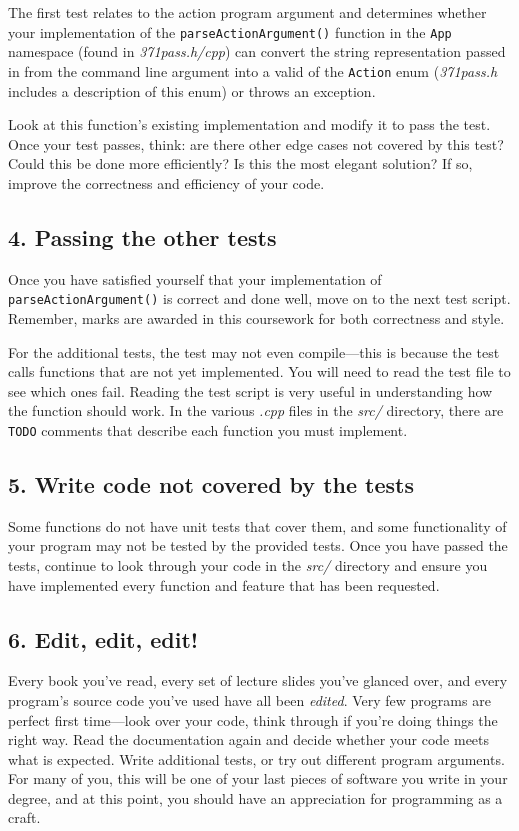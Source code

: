 \documentclass[a4paper]{article}
\begin{document}
The first test relates to the action program argument and determines whether your implementation of the \texttt{parseActionArgument()} function in the \texttt{App} namespace (found in \emph{371pass.h/cpp}) can convert the string representation passed in from the command line argument into a valid of the \texttt{Action} enum (\emph{371pass.h} includes a description of this enum) or throws an exception.

Look at this function's existing implementation and modify it to pass the test. Once your test passes, think: are there other edge cases not covered by this test? Could this be done more efficiently? Is this the most elegant solution? If so, improve the correctness and efficiency of your code.


\subsection*{4. Passing the other tests}\label{sec:tasks more-tests}
Once you have satisfied yourself that your implementation of \texttt{parseActionArgument()} is correct and done well, move on to the next test script. Remember, marks are awarded in this coursework for both correctness and style. 

For the additional tests, the test may not even compile---this is because the test calls functions that are not yet implemented. You will need to read the test file to see which ones fail. Reading the test script is very useful in understanding how the function should work. In the various \emph{.cpp} files in the \emph{src/} directory, there are \texttt{TODO} comments that describe each function you must implement.


\subsection*{5. Write code not covered by the tests}\label{sec:tasks untested-code}
Some functions do not have unit tests that cover them, and some functionality of your program may not be tested by the provided tests. Once you have passed the tests, continue to look through your code in the \emph{src/} directory and ensure you have implemented every function and feature that has been requested. 


\subsection*{6. Edit, edit, edit!}\label{sec:tasks edit}
Every book you've read, every set of lecture slides you've glanced over, and every program's source code you've used have all been \emph{edited}. Very few programs are perfect first time—look over your code, think through if you're doing things the right way. Read the documentation again and decide whether your code meets what is expected. Write additional tests, or try out different program arguments. For many of you, this will be one of your last pieces of software you write in your degree, and at this point, you should have an appreciation for programming as a craft.
\end{document}
